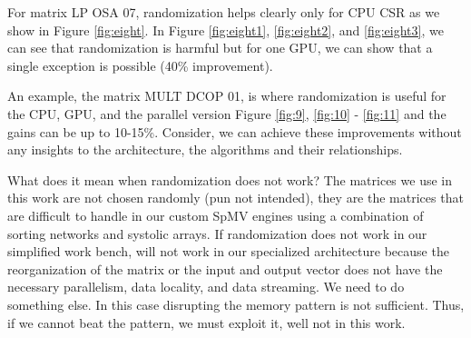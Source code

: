 \documentclass[acmsmall]{acmart}
\begin{document}

For matrix LP OSA 07, randomization helps clearly only for CPU CSR as
we show in Figure \ref{fig:eight}. In Figure \ref{fig:eight1},
\ref{fig:eight2}, and \ref{fig:eight3}, we can see that randomization
is harmful but for one GPU, we can show that a single exception is
possible (40\% improvement).



An example, the matrix MULT DCOP 01, is where randomization is useful
for the CPU, GPU, and the parallel version Figure \ref{fig:9},
\ref{fig:10} - \ref{fig:11} and the gains can be up to
10-15\%. Consider, we can achieve these improvements without any
insights to the architecture, the algorithms and their relationships.



What does it mean when randomization does not work? The matrices we
use in this work are not chosen randomly (pun not intended), they are
the matrices that are difficult to handle in our custom SpMV engines
using a combination of sorting networks and systolic arrays. If
randomization does not work in our simplified work bench, will not
work in our specialized architecture because the reorganization of the
matrix or the input and output vector does not have the necessary
parallelism, data locality, and data streaming. We need to do
something else. In this case disrupting the memory pattern is not
sufficient. Thus, if we cannot beat the pattern, we must exploit it,
well not in this work.
\end{document}
